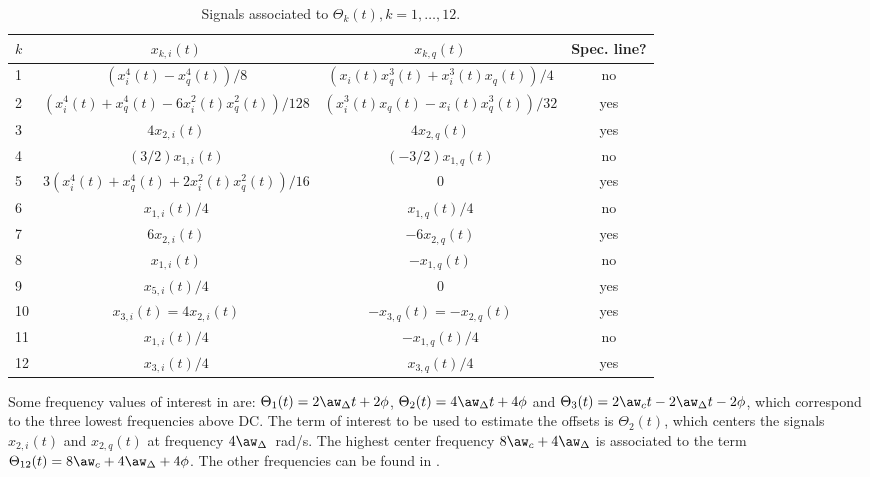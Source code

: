 \begin{table}
\centering
\caption{Signals associated to $\Theta_k(t), k=1,\ldots,12$.\label{tab:thetaSignals}}
\begin{tabular}{|l|c|c|c|}
\hline
$k$ & $x_{k,i}(t)$ & $x_{k,q}(t)$ & Spec. line? \\ \hline
1 & $(x_i^4(t)-x_q^4(t))/8$ & $(x_i(t)x_q^3(t)+x_i^3(t)x_q(t))/4$ & no\\ \hline
2 & $(x_i^4(t) + x_q^4(t)-6x_i^2(t)x_q^2(t))/128$ & $(x_i^3(t)x_q(t)-x_i(t)x_q^3(t))/32$ & yes\\ \hline
3 & $4 x_{2,i}(t)$ & $4x_{2,q}(t)$ & yes\\ \hline
4 & $(3/2) x_{1,i}(t)$ & $(-3/2)x_{1,q}(t)$ & no\\ \hline
5 & $3(x_i^4(t) + x_q^4(t) + 2 x_i^2(t)x_q^2(t))/16$ & 0 & yes\\ \hline
6 & $x_{1,i}(t)/4$ & $x_{1,q}(t)/4$ & no\\ \hline
7 & $6 x_{2,i}(t)$ & $-6x_{2,q}(t)$& yes\\ \hline
8 & $x_{1,i}(t)$ & $-x_{1,q}(t)$ & no\\ \hline
9 & $x_{5,i}(t)/4$ & 0 & yes\\ \hline
10 & $x_{3,i}(t) = 4x_{2,i}(t)$ & $-x_{3,q}(t) = -x_{2,q}(t)$ & yes\\ \hline
11 & $x_{1,i}(t)/4$ & $-x_{1,q}(t)/4$ & no\\ \hline
12 & $x_{3,i}(t)/4$ & $x_{3,q}(t)/4$& yes\\ \hline
\end{tabular}
\end{table}

Some frequency values of interest in  are:
$\Theta_{1}(t) = 2 \aw_{\Delta} t + 2 \phi$,
$\Theta_{2}(t) = 4 \aw_{\Delta} t + 4 \phi$ and
$\Theta_{3}(t) = 2 \aw_c t - 2 \aw_{\Delta} t - 2\phi$, which correspond
to the three lowest frequencies above DC. The term of interest to be used
to estimate the offsets is $\Theta_{2}(t)$, which centers the signals $x_{2,i}(t)$ and
$x_{2,q}(t)$
at frequency $4 \aw_{\Delta}$~rad/s.
The highest center frequency $8\aw_c + 4\aw_{\Delta}$ is associated to the term $\Theta_{12}(t) = 8\aw_c + 4\aw_{\Delta} + 4\phi$. The other frequencies can be found in .

